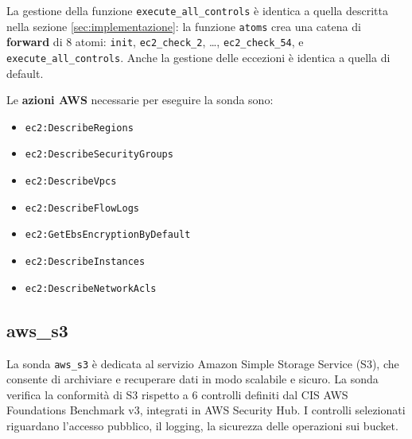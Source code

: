 La gestione della funzione \texttt{execute\_all\_controls} è identica a quella descritta nella sezione \ref{sec:implementazione}: la funzione \texttt{atoms} crea una catena di \textbf{forward} di 8 atomi: \texttt{init}, \texttt{ec2\_check\_2}, \dots, \texttt{ec2\_check\_54}, e \texttt{execute\_all\_controls}. Anche la gestione delle eccezioni è identica a quella di default.

\vspace{1em}

\noindent Le \textbf{azioni AWS} necessarie per eseguire la sonda sono:

\begin{itemize}
    \item \texttt{ec2:DescribeRegions}
    \item \texttt{ec2:DescribeSecurityGroups}
    \item \texttt{ec2:DescribeVpcs}
    \item \texttt{ec2:DescribeFlowLogs}
    \item \texttt{ec2:GetEbsEncryptionByDefault}
    \item \texttt{ec2:DescribeInstances}
    \item \texttt{ec2:DescribeNetworkAcls}
\end{itemize}

\subsection{aws\_s3}
\label{sec:s3}

La sonda \texttt{aws\_s3} è dedicata al servizio Amazon Simple Storage Service (S3), che consente di archiviare e recuperare dati in modo scalabile e sicuro. La sonda verifica la conformità di S3 rispetto a 6 controlli definiti dal CIS AWS Foundations Benchmark v3, integrati in AWS Security Hub. I controlli selezionati riguardano l'accesso pubblico, il logging, la sicurezza delle operazioni sui bucket.

